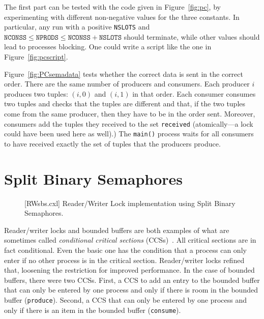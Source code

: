 \documentclass{report}
\newenvironment{code}{
\tcolorbox
}{
\endtcolorbox
}
\begin{document}
The first part can be tested with the code given in Figure~\ref{fig:pc}, by
experimenting with different non-negative values for the three constants.
In particular, any run with a positive \texttt{NSLOTS} and
$\mathtt{NCONSS} \le \mathtt{NPRODS} \le \mathtt{NCONSS} + \mathtt{NSLOTS}$
should terminate, while other values should lead to processes blocking.
One could write a script like the one in Figure~\ref{fig:pcscript}.

Figure~\ref{fig:PCsemadata} tests whether the correct data is sent in
the correct order.  There are the same number of producers and consumers.
Each producer $i$ produces two tuples: $(i, 0)$ and $(i, 1)$ in that order.
Each consumer consumes two tuples and checks that the tuples are different
and that, if the two tuples come from the same producer, then they have to
be in the order sent.
Moreover, consumers add the tuples they received to the set
\texttt{received} (atomically---a lock could have been used here as well).)
The \texttt{main()} process waits for all consumers to have received
exactly the set of tuples that the producers produce.

\chapter{Split Binary Semaphores}

\begin{figure}
\begin{code}
\end{code}
\caption{[RWsbs.cxl] Reader/Writer Lock implementation using Split Binary Semaphores.}
\label{fig:RWsplitsema}
\end{figure}

Reader/writer locks and bounded buffers are both examples of what are
sometimes called \emph{conditional critical sections}
(CCSs)~\cite{Hoare73}.
All critical sections are in fact conditional.  Even the basic one
has the condition that a process can only enter if no other process
is in the critical section.  Reader/writer locks refined that, loosening
the restriction for improved performance.
In the case of bounded buffers, there were two CCSs.  First, a CCS
to add an entry to the bounded buffer that can only be entered by one
process and only if there is room in the bounded buffer (\texttt{produce}).
Second, a CCS that can only be entered by one process and
only if there is an item in the bounded buffer (\texttt{consume}).
\end{document}
